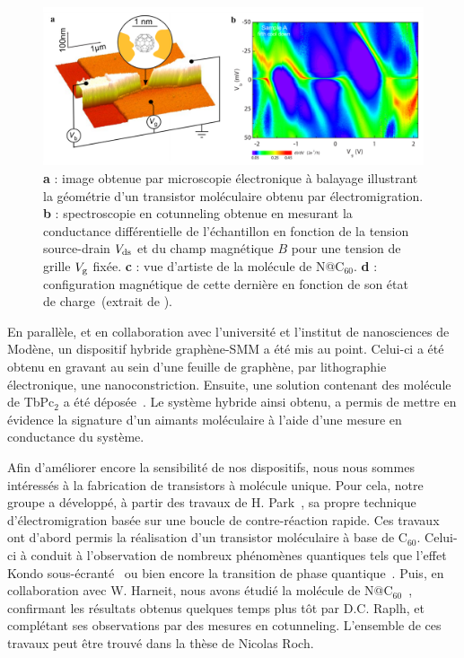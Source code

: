 \begin{figure}
\centering \includegraphics[scale=0.45]{Spintronique/RochC60/RochC60.pdf}
\caption{\textbf{a} : image obtenue par microscopie électronique à balayage illustrant la géométrie d'un transistor moléculaire obtenu par électromigration. \textbf{b} : spectroscopie en cotunneling obtenue en mesurant la conductance différentielle de l'échantillon en fonction de la tension source-drain $V_{\rm{ds}}$ et du champ magnétique $B$ pour une tension de grille $V_{\rm{g}}$ fixée. \textbf{c} : vue d'artiste de la molécule de N@C$_{60}$. \textbf{d} : configuration magnétique de cette dernière en fonction de son état de charge~(extrait de \cite{Roch2011}).}
\label{RochC60}
\end{figure}

En parallèle, et en collaboration avec l'université et l'institut de nanosciences de Modène, un dispositif hybride graphène-SMM a été mis au point. Celui-ci a été obtenu en gravant au sein d'une feuille de graphène, par lithographie électronique, une nanoconstriction. Ensuite, une solution contenant des molécule de TbPc$_{2}$ a été déposée~\cite{Candini2011}. Le système hybride ainsi obtenu, a permis de mettre en évidence la signature d'un aimants moléculaire à l'aide d'une mesure en conductance du système.

Afin d'améliorer encore la sensibilité de nos dispositifs, nous nous sommes intéressés à la fabrication de transistors à molécule unique. Pour cela, notre groupe a développé, à partir des travaux de H. Park~\cite{Park1999}, sa propre technique d'électromigration basée sur une boucle de contre-réaction rapide. Ces travaux ont d'abord permis la réalisation d'un transistor moléculaire à base de C$_{60}$. Celui-ci à conduit à l'observation de nombreux phénomènes quantiques tels que l'effet Kondo sous-écranté~\cite{Roch2009} ou bien encore la transition de phase quantique~\cite{Roch2008}. Puis, en collaboration avec W. Harneit, nous avons étudié la molécule de N@C$_{60}$~\cite{Roch2011}, confirmant les résultats obtenus quelques temps plus tôt par D.C. Raplh, et complétant ses observations par des mesures en cotunneling. L'ensemble de ces travaux peut être trouvé dans la thèse de Nicolas Roch.

